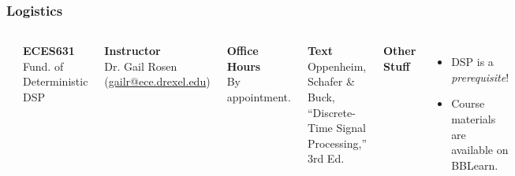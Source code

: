 \documentclass[mathserif,9pt,handout]{beamer}
\begin{document}
\begin{frame}\frametitle{Logistics}\small
  \begin{columns}
      \begin{center}\includegraphics[width=.8\textwidth]{dtsp.jpg}\end{center}
    {\bf\color{blue!50!black}ECES631} \\
    Fund. of Deterministic DSP \\
    \vspace{1em}
    
    {\bf\color{blue!50!black}Instructor} \\
    Dr. Gail Rosen ({\color{blue}\url{gailr@ece.drexel.edu}}) \\
    \vspace{1em}
    
    {\bf\color{blue!50!black}Office Hours} \\
    By appointment. \\
    \vspace{1em}

    
    {\bf\color{blue!50!black}Text} \\
    Oppenheim, Schafer \& Buck, ``Discrete-Time Signal Processing,'' 3rd Ed.
    \vspace{1em}
    
    {\bf\color{blue!50!black}Other Stuff}
    \begin{itemize}
      \item DSP is a {\em prerequisite}!
      \item Course materials are available on BBLearn.  
    \end{itemize}
    \vspace{1em}
  \end{columns}
\end{frame}
\end{document}
